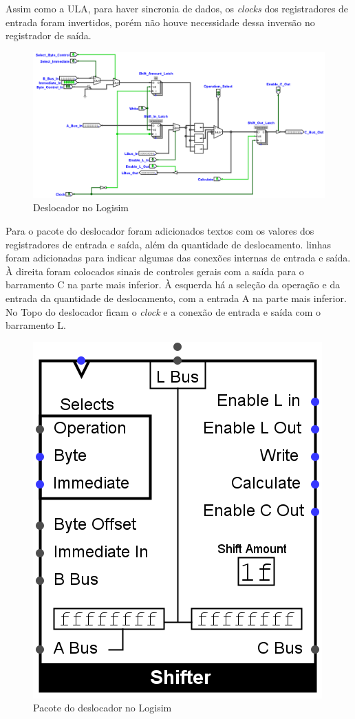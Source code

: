 \documentclass[
	article,			%
	11pt,				%
	oneside,			%
	a4paper,			%
	english,			%
	brazil,				%
	sumario=tradicional
	]{abntex2}
\begin{document}
Assim como a ULA, para haver sincronia de dados, os \textit{clocks} dos registradores de entrada foram invertidos, porém não houve necessidade dessa inversão no registrador de saída.
\begin{figure}[H]
    \centering
    \includegraphics[width=0.75\linewidth]{Logisim/shifter.png}
    \caption{Deslocador no Logisim}
    \label{fig: shifter}
\end{figure}
Para o pacote do deslocador foram adicionados textos com os valores dos registradores de entrada e saída, além da quantidade de deslocamento. linhas foram adicionadas para indicar algumas das conexões internas de entrada e saída. À direita foram colocados sinais de controles gerais com a saída para o barramento C na parte mais inferior. À esquerda há a seleção da operação e da entrada da quantidade de deslocamento, com a entrada A na parte mais inferior. No Topo do deslocador ficam o \textit{clock} e a conexão de entrada e saída com o barramento L.
\begin{figure}[H]
    \centering
    \includegraphics[width=0.25\linewidth]{Logisim/shifterPack.png}
    \caption{Pacote do deslocador no Logisim}
    \label{fig:shifterPack}
\end{figure}
\end{document}

